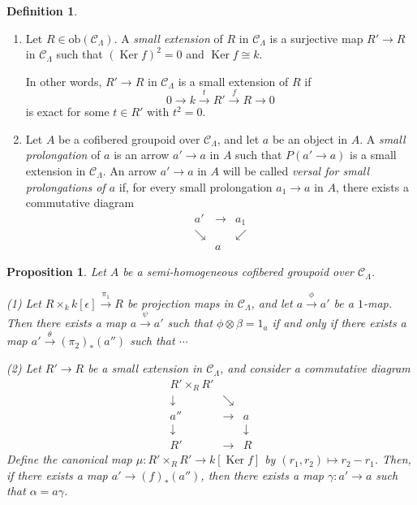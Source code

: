 \documentclass[11pt]{article}
\theoremstyle{plain}
\newtheorem{proposition}[theorem]{Proposition}
\theoremstyle{definition}
\newtheorem{definition}[theorem]{Definition}
\theoremstyle{remark}
\DeclareMathOperator{\Ker}{Ker}
\begin{document}
\begin{definition}
\begin{enumerate}[label=(\arabic*)]
\item Let $R \in \mathrm{ob}(\mathcal{C}_\Lambda)$. A \emph{small extension} of $R$ in $\mathcal{C}_\Lambda$ is a surjective map $R' \to R$ in $\mathcal{C}_\Lambda$ such that $(\Ker f)^2 = 0$ and $\Ker f \cong k$.

In other words, $R' \to R$ in $\mathcal{C}_\Lambda$ is a small extension of $R$ if
\[
0 \longrightarrow k \xrightarrow{\;t\;} R' \xrightarrow{\;f\;} R \longrightarrow 0
\]
is exact for some $t \in R'$ with $t^2 = 0$.

\item Let $A$ be a cofibered groupoid over $\mathcal{C}_\Lambda$, and let $a$ be an object in $A$. A \emph{small prolongation} of $a$ is an arrow $a' \to a$ in $A$ such that $P(a' \to a)$ is a small extension in $\mathcal{C}_\Lambda$. An arrow $a' \to a$ in $A$ will be called \emph{versal for small prolongations of $a$} if, for every small prolongation $a_1 \to a$ in $A$, there exists a commutative diagram
\[
\begin{array}{ccc}
a' & \longrightarrow & a_1 \\
\searrow & & \swarrow \\
& a &
\end{array}
\]
\end{enumerate}
\end{definition}

\begin{proposition}
Let $A$ be a semi-homogeneous cofibered groupoid over $\mathcal{C}_\Lambda$.

\textnormal{(1)} Let $R \times_k k[\epsilon] \xrightarrow{\pi_1} R$ be projection maps in $\mathcal{C}_\Lambda$, and let $a \xrightarrow{\phi} a'$ be a $1$-map. Then there exists a map $a \xrightarrow{\psi} a'$ such that $\phi \otimes \beta = 1_a$ if and only if there exists a map $a' \xrightarrow{\theta} (\pi_2)_*(a'')$ such that $\cdots$

\textnormal{(2)} Let $R' \to R$ be a small extension in $\mathcal{C}_\Lambda$, and consider a commutative diagram
\[
\begin{array}{ccc}
R' \times_R R' & & \\
\downarrow & \searrow & \\
a'' & \longrightarrow & a \\
\downarrow & & \downarrow \\
R' & \longrightarrow & R
\end{array}
\]
Define the canonical map $\mu: R' \times_R R' \to k[\Ker f]$ by $(r_1, r_2) \mapsto r_2 - r_1$. Then, if there exists a map $a' \to (f)_*(a'')$, then there exists a map $\gamma: a' \to a$ such that $\alpha = a\gamma$.
\end{proposition}
\end{document}

